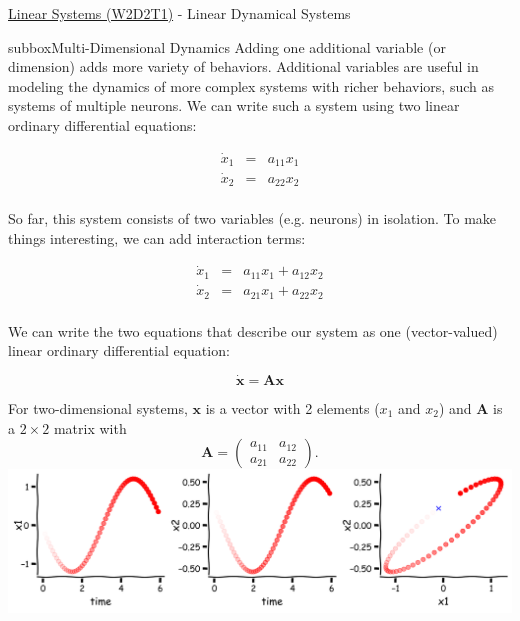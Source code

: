 \begin{textbox}{\href{https://compneuro.neuromatch.io/tutorials/W2D2_LinearSystems/student/W2D2_Tutorial1.html}{Linear Systems (W2D2T1)} -  Linear Dynamical Systems}
\begin{subbox}{subbox}{Multi-Dimensional Dynamics}
\scriptsize
Adding one additional variable (or dimension) adds more variety of behaviors. Additional variables are useful in modeling the dynamics of more complex systems with richer behaviors, such as systems of multiple neurons. We can write such a system using two linear ordinary differential equations:

\begin{eqnarray}
  \dot{x}_1 &=& {a}_{11} x_1 \\
  \dot{x}_2 &=& {a}_{22} x_2 \\
\end{eqnarray}

So far, this system consists of two variables (e.g. neurons) in isolation. To make things interesting, we can add interaction terms:

\begin{eqnarray}
  \dot{x}_1 &=& {a}_{11} x_1 + {a}_{12} x_2 \\
  \dot{x}_2 &=& {a}_{21} x_1 + {a}_{22} x_2 \\
\end{eqnarray}

We can write the two equations that describe our system as one (vector-valued) linear ordinary differential equation:

$$\dot{\mathbf{x}} = \mathbf{A} \mathbf{x}$$

For two-dimensional systems, $\mathbf{x}$ is a vector with 2 elements ($x_1$ and $x_2$) and $\mathbf{A}$ is a $2 \times 2$ matrix with 
$$\mathbf{A}=
\begin{pmatrix}
 a_{11} & a_{12} \\
 a_{21} & a_{22} 
\end{pmatrix}.
$$
\centering
\includegraphics[scale=0.12]{Figures/LS/LSFigure2.png}

\end{subbox}

\end{textbox}
